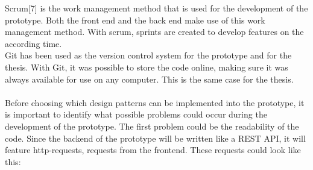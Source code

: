 \documentclass[paper=a4, fontsize=11pt,twoside]{scrartcl}	%
\begin{document}
Scrum[7] is the work management method that is used for the development of the prototype. Both the front end and the back end make use of this work management method. With scrum, sprints are created to develop features on the according time. \\ 
Git has been used as the version control system for the prototype and for the thesis. With Git, it was possible to store the code online, making sure it was always available for use on any computer. This is the same case for the thesis.
\\ \\
Before choosing which design patterns can be implemented into the prototype, it is important to identify what possible problems could occur during the development of the prototype. The first problem could be the readability of the code. Since the backend of the prototype will be written like a REST API, it will feature http-requests, requests from the frontend. These requests could look like this:
\end{document}
